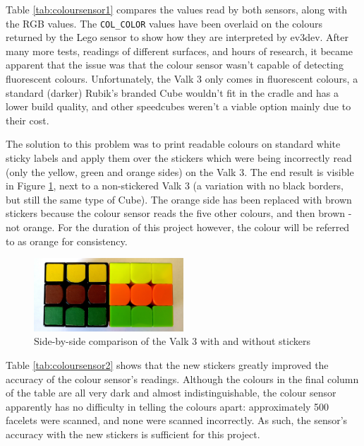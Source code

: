 \documentclass{report}
\begin{document}
	Table \ref{tab:coloursensor1} compares the values read by both sensors, along with the RGB values. The \lstinline|COL_COLOR| values have been overlaid on the colours returned by the Lego sensor to show how they are interpreted by ev3dev. After many more tests, readings of different surfaces, and hours of research, it became apparent that the issue was that the colour sensor wasn't capable of detecting fluorescent colours. Unfortunately, the Valk 3 only comes in fluorescent colours, a standard (darker) Rubik's branded Cube wouldn't fit in the cradle and has a lower build quality, and other speedcubes weren't a viable option mainly due to their cost.
	
	The solution to this problem was to print readable colours on standard white sticky labels and apply them over the stickers which were being incorrectly read (only the yellow, green and orange sides) on the Valk 3. The end result is visible in Figure \ref{fig:imgCubeStickersComparison}, next to a non-stickered Valk 3 (a variation with no black borders, but still the same type of Cube). The orange side has been replaced with brown stickers because the colour sensor reads the five other colours, and then brown - not orange. For the duration of this project however, the colour will be referred to as orange for consistency.

	\begin{figure}[H]
		\begin{center}
			\includegraphics[width=0.5\textwidth]{Resources/Images/imgCubeStickersComparison.jpg}
			\caption{Side-by-side comparison of the Valk 3 with and without stickers}
			\label{fig:imgCubeStickersComparison}
		\end{center}
	\end{figure}

	Table \ref{tab:coloursensor2} shows that the new stickers greatly improved the accuracy of the colour sensor's readings. Although the colours in the final column of the table are all very dark and almost indistinguishable, the colour sensor apparently has no difficulty in telling the colours apart: approximately 500 facelets were scanned, and none were scanned incorrectly. As such, the sensor's accuracy with the new stickers is sufficient for this project.
	
\end{document}
